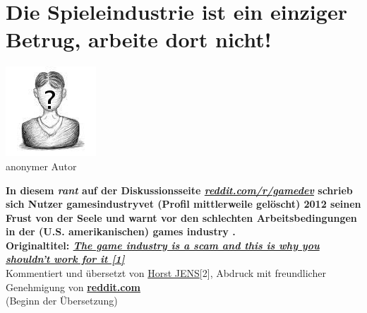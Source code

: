 \section*{Die Spieleindustrie ist ein einziger Betrug, arbeite dort nicht!}
\hypertarget{redditrant}{}
\label{redditrant}

\begin{center}
\includegraphics[width=0.8\linewidth]{redditrant/redditrant-nobody.jpg} \\ %
\footnotesize{anonymer Autor}
\end{center}

\textbf{In diesem \textit{rant} auf der Diskussionsseite \href{http://reddit.com/r/gamedev}{\textit{reddit.com/r/gamedev}} schrieb sich Nutzer 
\glqq
gamesindustryvet
\grqq (Profil mittlerweile gelöscht) 
2012 seinen Frust von der Seele und warnt vor den schlechten Arbeitsbedingungen in der
(U.S. amerikanischen) 
\glqq 
games industry
\grqq 
. \\ Originaltitel: \href{http://www.reddit.com/r/gamedev/comments/z83h2/the_games_industry_is_a_scam_and_this_is_why_you}{\textit{The game industry is a scam and this is why you shouldn't work for it [1]}}} \\

Kommentiert und übersetzt von \href{http://spielend-programmieren.at}{Horst JENS}[2], Abdruck mit freundlicher Genehmigung von \href{http://reddit.com}{\textbf{reddit.com}} \\

(Beginn der Übersetzung)

